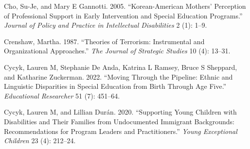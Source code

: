 \documentclass[
  letterpaper,
  DIV=11,
  numbers=noendperiod]{scrartcl}
\newlength{\cslhangindent}
\newenvironment{CSLReferences}[2] %
 {\begin{list}{}{%
  \setlength{\itemindent}{0pt}
  \setlength{\leftmargin}{0pt}
  \setlength{\parsep}{0pt}
  \ifodd #1
   \setlength{\leftmargin}{\cslhangindent}
   \setlength{\itemindent}{-1\cslhangindent}
  \fi
  \setlength{\itemsep}{#2\baselineskip}}}
 {\end{list}}
\begin{document}
\label{refs}
\begin{CSLReferences}{1}{0}
Cho, Su-Je, and Mary E Gannotti. 2005. {``Korean-American Mothers'
Perception of Professional Support in Early Intervention and Special
Education Programs.''} \emph{Journal of Policy and Practice in
Intellectual Disabilities} 2 (1): 1--9.

Crenshaw, Martha. 1987. {``Theories of Terrorism: Instrumental and
Organizational Approaches.''} \emph{The Journal of Strategic Studies} 10
(4): 13--31.

Cycyk, Lauren M, Stephanie De Anda, Katrina L Ramsey, Bruce S Sheppard,
and Katharine Zuckerman. 2022. {``Moving Through the Pipeline: Ethnic
and Linguistic Disparities in Special Education from Birth Through Age
Five.''} \emph{Educational Researcher} 51 (7): 451--64.

Cycyk, Lauren M, and Lillian Durán. 2020. {``Supporting Young Children
with Disabilities and Their Families from Undocumented Immigrant
Backgrounds: Recommendations for Program Leaders and Practitioners.''}
\emph{Young Exceptional Children} 23 (4): 212--24.

\end{CSLReferences}
\end{document}
